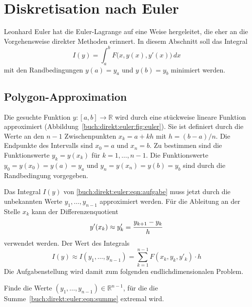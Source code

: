 %
%
%
\section{Diskretisation nach Euler
\label{buch:direkt:section:euler}}
Leonhard Euler
%
%
hat die Euler-Lagrange auf eine Weise hergeleitet, die eher an die 
Vorgehensweise direkter Methoden erinnert.
In diesem Abschnitt soll das Integral
\begin{equation}
I(y)
=
\int_a^b
F\bigl(x,y(x),y'(x)\bigr)
\,dx
\label{buch:direkt:euler:eqn:aufgabe}
\end{equation}
mit den Randbedingungen $y(a)=y_a$ und $y(b)=y_b$ minimiert werden.

%
%
\subsection{Polygon-Approximation
\label{buch:direkt:euler:subsection:polygon}}

Die gesuchte Funktion $y\colon[a,b]\to\mathbb{R}$ wird durch eine stückweise
lineare Funktion approximiert (Abbildung~\ref{buch:direkt:euler:fig:euler}).
Sie ist definiert durch die Werte an den $n-1$ Zwischenpunkten
$x_k=a+kh$ mit $h=(b-a)/n$.
Die Endpunkte des Intervalls sind $x_0=a$ und $x_n=b$.
Zu bestimmen sind die Funktionswerte $y_k = y(x_k)$ für $k=1,\dots,n-1$.
Die Funktionswerte $y_0=y(x_0)=y(a)=y_a$ und $y_n=y(x_n)=y(b)=y_b$ 
sind durch die Randbedingung vorgegeben.

Das Integral $I(y)$ von \eqref{buch:direkt:euler:eqn:aufgabe} muss
jetzt durch die unbekannten Werte $y_1,\dots,y_{n-1}$ approximiert
werden.
Für die Ableitung an der Stelle $x_k$ kann der Differenzenquotient
\[
y'(x_k) 
\approx
y'_k
=
\frac{y_{k+1\mathstrut}-y_{k\mathstrut}}{h}
\]
verwendet werden.
Der Wert des Integrals 
\begin{equation}
I(y)
\approx
I(y_1,\dots,y_{n-1})
=
\sum_{k=1}^{n-1}
F(x_k, y_k, y'_k)\cdot h
\label{buch:direkt:euler:eqn:summe}
\end{equation}
Die Aufgabenstellung wird damit zum folgenden endlichdimensionalen
Problem.

\begin{aufgabe}
Finde die Werte $(y_1,\dots,y_{n-1})\in\mathbb{R}^{n-1}$, für die
die Summe~\eqref{buch:direkt:euler:eqn:summe} extremal wird.
\end{aufgabe}

